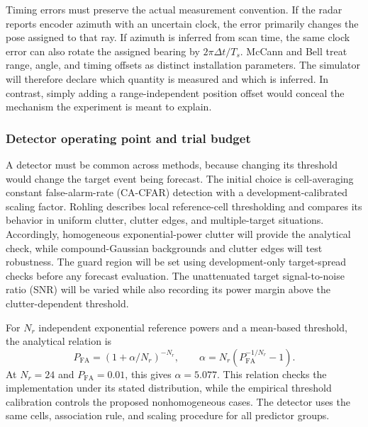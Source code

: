 \documentclass[10pt,letterpaper]{article}
\begin{document}
Timing errors must preserve the actual measurement convention. If the radar reports encoder azimuth with an uncertain clock, the error primarily changes the pose assigned to that ray. If azimuth is inferred from scan time, the same clock error can also rotate the assigned bearing by $2\pi\Delta t/T_s$. McCann and Bell treat range, angle, and timing offsets as distinct installation parameters. \cite{McCann2018OffsetCalibration} The simulator will therefore declare which quantity is measured and which is inferred. In contrast, simply adding a range-independent position offset would conceal the mechanism the experiment is meant to explain.

\subsubsection{Detector operating point and trial budget}

A detector must be common across methods, because changing its threshold would change the target event being forecast. The initial choice is cell-averaging constant false-alarm-rate (CA-CFAR) detection with a development-calibrated scaling factor. Rohling describes local reference-cell thresholding and compares its behavior in uniform clutter, clutter edges, and multiple-target situations. \cite{Rohling1983RadarCFAR} Accordingly, homogeneous exponential-power clutter will provide the analytical check, while compound-Gaussian backgrounds and clutter edges will test robustness. The guard region will be set using development-only target-spread checks before any forecast evaluation. The unattenuated target signal-to-noise ratio (SNR) will be varied while also recording its power margin above the clutter-dependent threshold.

For $N_r$ independent exponential reference powers and a mean-based threshold, the analytical relation is
\begin{equation}
\label{eq:cfar-check}
P_{\mathrm{FA}}=(1+\alpha/N_r)^{-N_r},\qquad
\alpha=N_r\left(P_{\mathrm{FA}}^{-1/N_r}-1\right).
\end{equation}
At $N_r=24$ and $P_{\mathrm{FA}}=0.01$, this gives $\alpha=5.077$. This relation checks the implementation under its stated distribution, while the empirical threshold calibration controls the proposed nonhomogeneous cases. The detector uses the same cells, association rule, and scaling procedure for all predictor groups.
\end{document}
